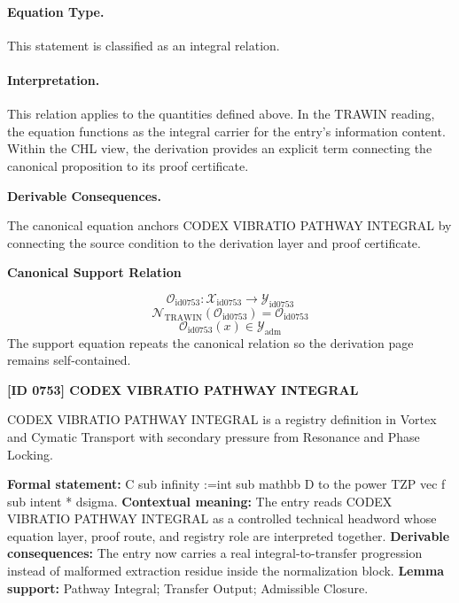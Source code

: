 \paragraph{Equation Type.}
This statement is classified as an integral relation.

\paragraph{Interpretation.}
This relation applies to the quantities defined above. In the TRAWIN reading, the equation functions as the integral carrier for the entry’s information content. Within the CHL view, the derivation provides an explicit term connecting the canonical proposition to its proof certificate.

\par\vspace{0.35em}
\noindent\textbf{Derivable Consequences.}\quad
\begingroup
\footnotesize
\raggedright
The canonical equation anchors CODEX VIBRATIO PATHWAY INTEGRAL by connecting the source condition to the derivation layer and proof certificate.
\par\endgroup

\noindent\textbf{Canonical Support Relation}\par
\[
\mathcal{O}_{\mathrm{id0753}}:\mathcal{X}_{\mathrm{id0753}}\longrightarrow\mathcal{Y}_{\mathrm{id0753}}
\]
\[
\mathcal{N}_{\mathrm{TRAWIN}}(\mathcal{O}_{\mathrm{id0753}})=\mathcal{O}_{\mathrm{id0753}}
\]
\[
\mathcal{O}_{\mathrm{id0753}}(x)\in\mathcal{Y}_{\mathrm{adm}}
\]
\noindent The support equation repeats the canonical relation so the derivation page remains self-contained.\par

\clearpage
\noindent\textbf{[ID 0753] CODEX VIBRATIO PATHWAY INTEGRAL}\par
\vspace{0.35em}
\begingroup\small
{}
CODEX VIBRATIO PATHWAY INTEGRAL is a registry definition in Vortex and Cymatic Transport with secondary pressure from Resonance and Phase Locking.

\begingroup\footnotesize\setlength{\emergencystretch}{3em}\sloppy
\textbf{Formal statement:} C sub infinity :=int sub mathbb D to the power TZP vec f sub intent * dsigma. \textbf{Contextual meaning:} The entry reads CODEX VIBRATIO PATHWAY INTEGRAL as a controlled technical headword whose equation layer, proof route, and registry role are interpreted together. \textbf{Derivable consequences:} The entry now carries a real integral-to-transfer progression instead of malformed extraction residue inside the normalization block. \textbf{Lemma support:} Pathway Integral; Transfer Output; Admissible Closure.\par
\endgroup

